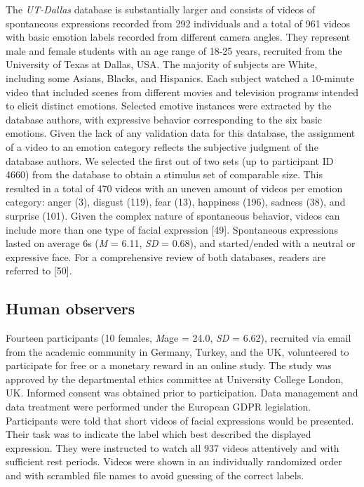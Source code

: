 \documentclass[10pt,letterpaper]{article}
\begin{document}
The \emph{UT-Dallas} database is substantially larger and consists of videos of spontaneous expressions recorded from 292 individuals and a total of 961 videos with basic emotion labels recorded from different camera angles. They represent male and female students with an age range of 18-25 years, recruited from the University of Texas at Dallas, USA. The majority of subjects are White, including some Asians, Blacks, and Hispanics. Each subject watched a 10-minute video that included scenes from different movies and television programs intended to elicit distinct emotions. Selected emotive instances were extracted by the database authors, with expressive behavior corresponding to the six basic emotions. Given the lack of any validation data for this database, the assignment of a video to an emotion category reflects the subjective judgment of the database authors. We selected the first out of two sets (up to participant ID 4660) from the database to obtain a stimulus set of comparable size. This resulted in a total of 470 videos with an uneven amount of videos per emotion category: anger (3), disgust (119), fear (13), happiness (196), sadness (38), and surprise (101). Given the complex nature of spontaneous behavior, videos can include more than one type of facial expression {[}49{]}. Spontaneous expressions lasted on average 6s (\textit{M} = 6.11, \textit{SD} = 0.68), and started/ended with a neutral or expressive face. For a comprehensive review of both databases, readers are referred to {[}50{]}.

\hypertarget{human-observers}{%
\subsection*{Human observers}\label{human-observers}}

Fourteen participants (10 females, \textit{M}age = 24.0, \textit{SD} = 6.62), recruited via email from the academic community in Germany, Turkey, and the UK, volunteered to participate for free or a monetary reward in an online study. The study was approved by the departmental ethics committee at University College London, UK. Informed consent was obtained prior to participation. Data management and data treatment were performed under the European GDPR legislation. Participants were told that short videos of facial expressions would be presented. Their task was to indicate the label which best described the displayed expression. They were instructed to watch all 937 videos attentively and with sufficient rest periods. Videos were shown in an individually randomized order and with scrambled file names to avoid guessing of the correct labels.
\end{document}
